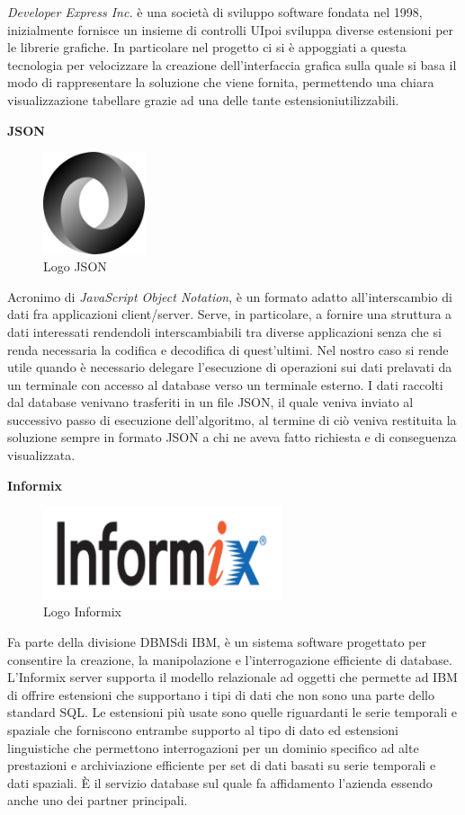 \textit{Developer Express Inc.} è una società di sviluppo software fondata nel 1998, inizialmente fornisce un insieme di controlli UI\glosp poi sviluppa diverse estensioni per le librerie grafiche.
In particolare nel progetto ci si è appoggiati a questa tecnologia per velocizzare la creazione dell'interfaccia grafica sulla quale si basa il modo di rappresentare la soluzione
che viene fornita, permettendo una chiara visualizzazione tabellare grazie ad una delle tante estensioni\glosp utilizzabili. 


\textbf{JSON}

\begin{figure}[H]
	\includegraphics[width=3cm]{immagini/json.png}
	\centering
	\caption{Logo JSON}
\end{figure}

Acronimo di \textit{JavaScript Object Notation}, è un formato adatto all'interscambio di dati fra applicazioni client/server\glo.
Serve, in particolare, a fornire una struttura a dati interessati rendendoli interscambiabili tra diverse applicazioni senza che si renda necessaria la codifica e decodifica di quest'ultimi.
Nel nostro caso si rende utile quando è necessario delegare l'esecuzione di operazioni sui dati prelavati da un terminale con accesso al database verso un terminale esterno.
I dati raccolti dal database venivano trasferiti in un file JSON, il quale veniva inviato al successivo passo di esecuzione dell'algoritmo, al termine di ciò veniva restituita
la soluzione sempre in formato JSON a chi ne aveva fatto richiesta e di conseguenza visualizzata.

\textbf{Informix}

\begin{figure}[H]
	\includegraphics[width=7cm]{immagini/Informix.png}
	\centering
	\caption{Logo Informix}
\end{figure}

Fa parte della divisione DBMS\glosp di IBM\glosp, è un sistema software progettato per consentire la creazione, la manipolazione e l'interrogazione efficiente di database.
L'Informix server supporta il modello relazionale ad oggetti che permette ad IBM di offrire estensioni che supportano i tipi di dati che non sono una parte dello standard SQL\glo.
Le estensioni più usate sono quelle riguardanti le serie temporali e spaziale che forniscono entrambe supporto al tipo di dato ed estensioni linguistiche che permettono 
interrogazioni per un dominio specifico ad alte prestazioni e archiviazione efficiente per set di dati basati su serie temporali e dati spaziali.
È il servizio database sul quale fa affidamento l'azienda essendo anche uno dei partner principali.